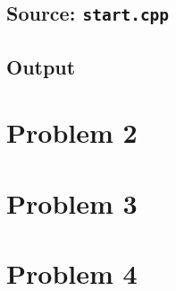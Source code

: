 \documentclass{article}
\begin{document}
\pagebreak

\subsection{Source: \texttt{start.cpp}} \label{sec:src1}

{\centering \small

}

\pagebreak

\subsection{Output} \label{sec:output1}

{\centering \small
{}
}

\section{Problem 2}

\section{Problem 3}

\section{Problem 4}
\end{document}

